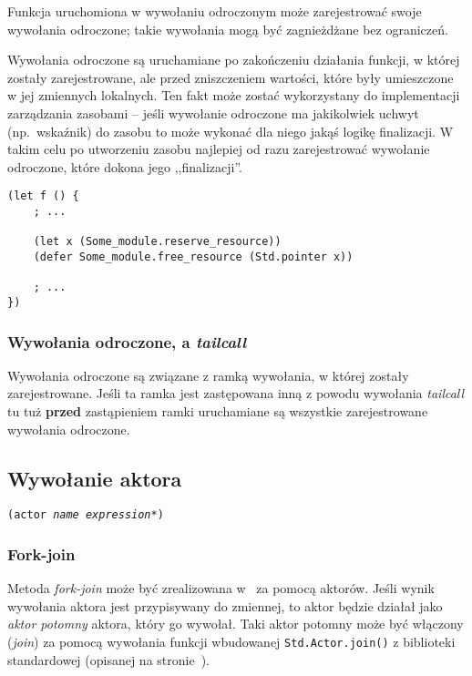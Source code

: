 Funkcja uruchomiona w wywołaniu odroczonym może zarejestrować swoje wywołania
odroczone; takie wywołania mogą być zagnieżdżane bez ograniczeń.

Wywołania odroczone są uruchamiane po zakończeniu działania funkcji, w której
zostały zarejestrowane, ale przed zniszczeniem wartości, które były umieszczone
w jej zmiennych lokalnych. Ten fakt może zostać wykorzystany do implementacji
zarządzania zasobami -- jeśli wywołanie odroczone ma jakikolwiek uchwyt
(np.~wskaźnik) do zasobu to może wykonać dla niego jakąś logikę finalizacji.
W takim celu po utworzeniu zasobu najlepiej od razu zarejestrować wywołanie
odroczone, które dokona jego ,,finalizacji''.

\begin{lstlisting}
(let f () {
    ; ...

    (let x (Some_module.reserve_resource))
    (defer Some_module.free_resource (Std.pointer x))

    ; ...
})
\end{lstlisting}

\subsubsection{Wywołania odroczone, a \emph{tailcall}}

Wywołania odroczone są związane z ramką wywołania, w której zostały
zarejestrowane. Jeśli ta ramka jest zastępowana inną z powodu wywołania
\emph{tailcall} tu tuż \textbf{przed} zastąpieniem ramki uruchamiane są
wszystkie zarejestrowane wywołania odroczone.

\subsection{Wywołanie aktora}
\label{viuact_spec_actor_call}

\texttt{(actor \emph{name} \emph{expression}*)}

\subsubsection{Fork-join}

Metoda \emph{fork-join} może być zrealizowana w \ViuAct\ za pomocą aktorów.
Jeśli wynik wywołania aktora jest przypisywany do zmiennej, to aktor będzie
działał jako \emph{aktor potomny} aktora, który go wywołał. Taki aktor potomny
może być włączony (\emph{join}) za pomocą wywołania funkcji wbudowanej
\texttt{Std.Actor.join()} z biblioteki standardowej (opisanej na
stronie~\pageref{Std_Actor_join}).

